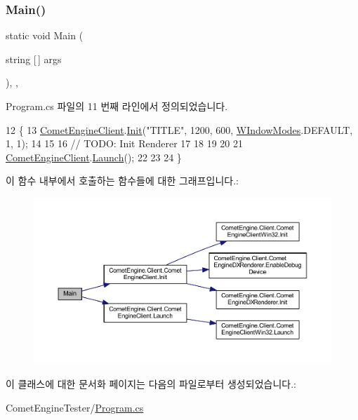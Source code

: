 \subsubsection{\texorpdfstring{Main()}{Main()}}
{\footnotesize\ttfamily static void Main (\begin{DoxyParamCaption}\item[{string \mbox{[}$\,$\mbox{]}}]{args }\end{DoxyParamCaption})\hspace{0.3cm}{\ttfamily [inline]}, {\ttfamily [static]}, {\ttfamily [private]}}



Program.\+cs 파일의 11 번째 라인에서 정의되었습니다.


\begin{DoxyCode}
12         \{
13             \hyperlink{class_comet_engine_1_1_client_1_1_comet_engine_client}{CometEngineClient}.\hyperlink{class_comet_engine_1_1_client_1_1_comet_engine_client_af5f8db49a5de5bb41cf935066d21f5aa}{Init}(\textcolor{stringliteral}{"TITLE"}, 1200, 600, 
      \hyperlink{namespace_comet_engine_1_1_client_a608d2e459fd95babca189e50f4182a65}{WIndowModes}.DEFAULT, 1, 1);
14             
15 
16             \textcolor{comment}{// TODO: Init Renderer }
17 
18 
19 
20 
21             \hyperlink{class_comet_engine_1_1_client_1_1_comet_engine_client}{CometEngineClient}.\hyperlink{class_comet_engine_1_1_client_1_1_comet_engine_client_aee7b13887a71ba1fcd42c5fbccf124d4}{Launch}();
22 
23 
24         \}
\end{DoxyCode}
이 함수 내부에서 호출하는 함수들에 대한 그래프입니다.\+:\nopagebreak
\begin{figure}[H]
\begin{center}
\leavevmode
\includegraphics[width=350pt]{class_comet_engine_tester_1_1_program_a25f94f55e8993781b6a82d5eb88ea252_cgraph}
\end{center}
\end{figure}


이 클래스에 대한 문서화 페이지는 다음의 파일로부터 생성되었습니다.\+:\begin{DoxyCompactItemize}
\item 
Comet\+Engine\+Tester/\hyperlink{_program_8cs}{Program.\+cs}\end{DoxyCompactItemize}
